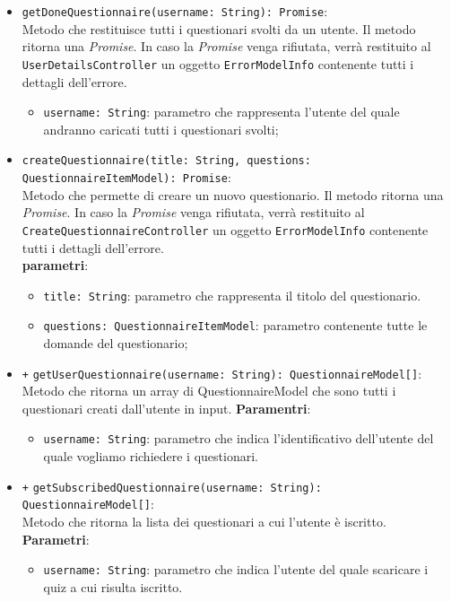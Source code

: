 \begin{itemize}
\begin{itemize}
	\end{itemize}
	\item \texttt{getDoneQuestionnaire(username: String): Promise}: \\ Metodo che restituisce tutti i questionari svolti da un utente. Il metodo ritorna una \textit{Promise}. In caso la \textit{Promise} venga rifiutata, verrà restituito al \texttt{UserDetailsController} un oggetto \texttt{ErrorModelInfo} contenente tutti i dettagli dell'errore. \\ 
	\begin{itemize}
		\item \texttt{username: String}: parametro che rappresenta l'utente del quale andranno caricati tutti i questionari svolti;
	\end{itemize}
	\item \texttt{createQuestionnaire(title: String, questions: QuestionnaireItemModel): Promise}: \\ Metodo che permette di creare un nuovo questionario. Il metodo ritorna una \textit{Promise}. In caso la \textit{Promise} venga rifiutata, verrà restituito al \texttt{CreateQuestionnaireController} un oggetto \texttt{ErrorModelInfo} contenente tutti i dettagli dell'errore. \\
	\textbf{parametri}:
	\begin{itemize}
		\item \texttt{title: String}: parametro che rappresenta il titolo del questionario.
		\item \texttt{questions: QuestionnaireItemModel}: parametro contenente tutte le domande del questionario;
	\end{itemize}
	\item \texttt{+} \texttt{getUserQuestionnaire(username: String): QuestionnaireModel[]}: \\Metodo che ritorna un array di QuestionnaireModel che sono tutti i questionari creati dall'utente in input.
	\textbf{Paramentri}:
	\begin{itemize}
		\item \texttt{username: String}: parametro che indica l'identificativo dell'utente del quale vogliamo richiedere i questionari.
	\end{itemize}
	\item \texttt{+} \texttt{getSubscribedQuestionnaire(username: String): QuestionnaireModel[]}: \\Metodo che ritorna la lista dei questionari a cui l'utente è iscritto.
	\textbf{Parametri}:
	\begin{itemize}
		\item \texttt{username: String}: parametro che indica l'utente del quale scaricare i quiz a cui risulta iscritto.
	\end{itemize}
\end{itemize}

